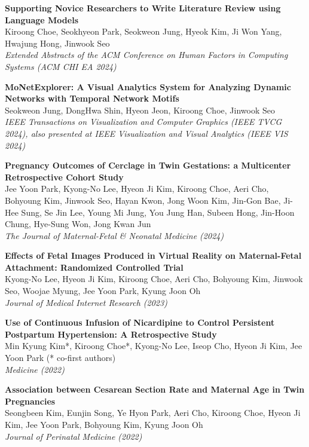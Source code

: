 \documentclass[margin]{res}
\begin{document}
\begin{resume}
\par
\textbf{Supporting Novice Researchers to Write Literature Review using Language Models}\\
Kiroong Choe, Seokhyeon Park, Seokweon Jung, Hyeok Kim, Ji Won Yang, Hwajung Hong, Jinwook Seo\\
\textit{Extended Abstracts of the ACM Conference on Human Factors in Computing Systems (ACM CHI EA 2024)}

\par
\textbf{MoNetExplorer: A Visual Analytics System for Analyzing Dynamic Networks with Temporal Network Motifs}\\
Seokweon Jung, DongHwa Shin, Hyeon Jeon, Kiroong Choe, Jinwook Seo\\
\textit{IEEE Transactions on Visualization and Computer Graphics (IEEE TVCG 2024), also presented at IEEE Visualization and Visual Analytics (IEEE VIS 2024)}

\par
\textbf{Pregnancy Outcomes of Cerclage in Twin Gestations: a Multicenter Retrospective Cohort Study}\\
Jee Yoon Park, Kyong-No Lee, Hyeon Ji Kim, Kiroong Choe, Aeri Cho, Bohyoung Kim, Jinwook Seo, Hayan Kwon, Jong Woon Kim, Jin-Gon Bae, Ji-Hee Sung, Se Jin Lee, Young Mi Jung, You Jung Han, Subeen Hong, Jin-Hoon Chung, Hye-Sung Won, Jong Kwan Jun\\
\textit{The Journal of Maternal-Fetal \& Neonatal Medicine (2024)}

\par
\textbf{Effects of Fetal Images Produced in Virtual Reality on Maternal-Fetal Attachment: Randomized Controlled Trial}\\
Kyong-No Lee, Hyeon Ji Kim, Kiroong Choe, Aeri Cho, Bohyoung Kim, Jinwook Seo, Woojae Myung, Jee Yoon Park, Kyung Joon Oh\\
\textit{Journal of Medical Internet Research (2023)}

\par
\textbf{Use of Continuous Infusion of Nicardipine to Control Persistent Postpartum Hypertension: A Retrospective Study}\\
Min Kyung Kim*, Kiroong Choe*, Kyong-No Lee, Iseop Cho, Hyeon Ji Kim, Jee Yoon Park (* co-first authors)\\
\textit{Medicine (2022)}

\par
\textbf{Association between Cesarean Section Rate and Maternal Age in Twin Pregnancies}\\
Seongbeen Kim, Eunjin Song, Ye Hyon Park, Aeri Cho, Kiroong Choe, Hyeon Ji Kim, Jee Yoon Park, Bohyoung Kim, Kyung Joon Oh\\
\textit{Journal of Perinatal Medicine (2022)}


\end{resume}
\end{document}
